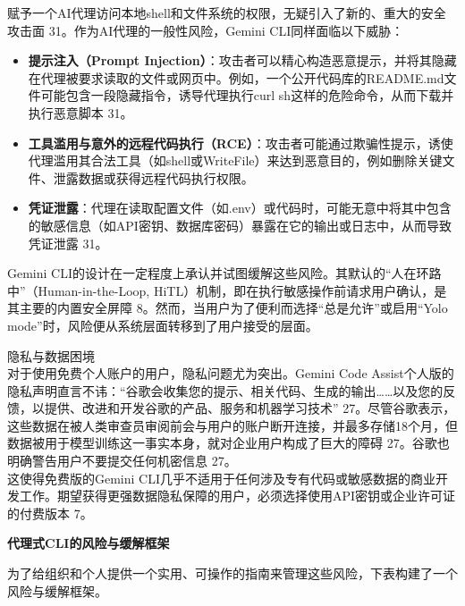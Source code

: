 \documentclass[a4paper,12pt]{article}
\providecommand{\tightlist}{%
  \setlength{\itemsep}{0pt}\setlength{\parskip}{0pt}}
\begin{document}
\begin{multicols}{2}
    赋予一个AI代理访问本地shell和文件系统的权限，无疑引入了新的、重大的安全攻击面
    31。作为AI代理的一般性风险，Gemini CLI同样面临以下威胁：

    \begin{itemize}
    \tightlist
    \item
      \textbf{提示注入（Prompt
      Injection）}：攻击者可以精心构造恶意提示，并将其隐藏在代理被要求读取的文件或网页中。例如，一个公开代码库的README.md文件可能包含一段隐藏指令，诱导代理执行curl
      \textbar{} sh这样的危险命令，从而下载并执行恶意脚本 31。\\
    \item
      \textbf{工具滥用与意外的远程代码执行（RCE）}：攻击者可能通过欺骗性提示，诱使代理滥用其合法工具（如shell或WriteFile）来达到恶意目的，例如删除关键文件、泄露数据或获得远程代码执行权限。\\
    \item
      \textbf{凭证泄露}：代理在读取配置文件（如.env）或代码时，可能无意中将其中包含的敏感信息（如API密钥、数据库密码）暴露在它的输出或日志中，从而导致凭证泄露
      31。
    \end{itemize}

    Gemini
    CLI的设计在一定程度上承认并试图缓解这些风险。其默认的``人在环路中''（Human-in-the-Loop,
    HiTL）机制，即在执行敏感操作前请求用户确认，是其主要的内置安全屏障
    8。然而，当用户为了便利而选择``总是允许''或启用``Yolo
    mode''时，风险便从系统层面转移到了用户接受的层面。

    隐私与数据困境\\
    对于使用免费个人账户的用户，隐私问题尤为突出。Gemini Code
    Assist个人版的隐私声明直言不讳：``谷歌会收集您的提示、相关代码、生成的输出\ldots\ldots 以及您的反馈，以提供、改进和开发谷歌的产品、服务和机器学习技术''
    27。尽管谷歌表示，这些数据在被人类审查员审阅前会与用户的账户断开连接，并最多存储18个月，但数据被用于模型训练这一事实本身，就对企业用户构成了巨大的障碍
    27。谷歌也明确警告用户不要提交任何机密信息 27。\\
    这使得免费版的Gemini
    CLI几乎不适用于任何涉及专有代码或敏感数据的商业开发工作。期望获得更强数据隐私保障的用户，必须选择使用API密钥或企业许可证的付费版本
    7。

    \textbf{代理式CLI的风险与缓解框架}

    为了给组织和个人提供一个实用、可操作的指南来管理这些风险，下表构建了一个风险与缓解框架。


\end{multicols}
\end{document}
